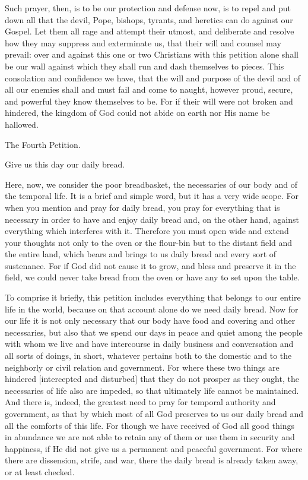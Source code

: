 Such prayer, then, is to be our protection and defense now, is to
repel and put down all that the devil, Pope, bishops, tyrants, and
heretics can do against our Gospel. Let them all rage and attempt their
utmost, and deliberate and resolve how they may suppress and
exterminate us, that their will and counsel may prevail: over and
against this one or two Christians with this petition alone shall be
our wall against which they shall run and dash themselves to pieces.
This consolation and confidence we have, that the will and purpose of
the devil and of all our enemies shall and must fail and come to
naught, however proud, secure, and powerful they know themselves to be.
For if their will were not broken and hindered, the kingdom of God
could not abide on earth nor His name be hallowed.

 The Fourth Petition.

Give us this day our daily bread.

Here, now, we consider the poor breadbasket, the necessaries of our
body and of the temporal life. It is a brief and simple word, but it
has a very wide scope. For when you mention and pray for daily bread,
you pray for everything that is necessary in order to have and enjoy
daily bread and, on the other hand, against everything which interferes
with it. Therefore you must open wide and extend your thoughts not only
to the oven or the flour-bin but to the distant field and the entire
land, which bears and brings to us daily bread and every sort of
sustenance. For if God did not cause it to grow, and bless and preserve
it in the field, we could never take bread from the oven or have any to
set upon the table.

To comprise it briefly, this petition includes everything that belongs
to our entire life in the world, because on that account alone do we
need daily bread. Now for our life it is not only necessary that our
body have food and covering and other necessaries, but also that we
spend our days in peace and quiet among the people with whom we live
and have intercourse in daily business and conversation and all sorts
of doings, in short, whatever pertains both to the domestic and to the
neighborly or civil relation and government. For where these two things
are hindered [intercepted and disturbed] that they do not prosper as
they ought, the necessaries of life also are impeded, so that
ultimately life cannot be maintained. And there is, indeed, the
greatest need to pray for temporal authority and government, as that by
which most of all God preserves to us our daily bread and all the
comforts of this life. For though we have received of God all good
things in abundance we are not able to retain any of them or use them
in security and happiness, if He did not give us a permanent and
peaceful government. For where there are dissension, strife, and war,
there the daily bread is already taken away, or at least checked.

